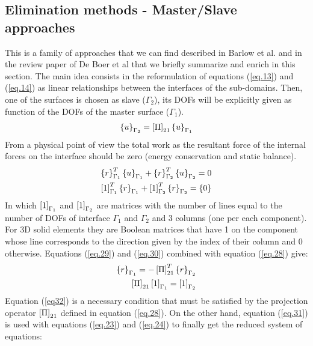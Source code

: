   \subsection{Elimination methods - Master/Slave  approaches}\label{ssec33}
  This is a family of approaches that we can find described in Barlow et al. \cite{barlow1982constraint} and in the review paper of De Boer et al \cite{de2007review} that we briefly summarize and enrich in this section. The main idea consists in the reformulation of equations (\ref{eq.13}) and (\ref{eq.14}) as linear relationships between the interfaces of the sub-domains. Then, one of the surfaces is chosen as slave ($\Gamma_2$), its DOFs will be explicitly given as function of the DOFs of the master surface ($\Gamma_1$).  
  \begin{equation}
  \label{eq.28}
  \left\lbrace{u}\right \rbrace_{\Gamma_2}=\left[{\Pi}\right]_{21}\left\lbrace{u}\right \rbrace_{\Gamma_1}
  \end{equation}
  From a physical point of view the total work as the resultant force  of the internal forces on the interface should be zero (energy conservation and static balance).
  \begin{eqnarray}
  \label{eq.29}
  \left\lbrace{r}\right \rbrace_{\Gamma_1}^T\left\lbrace{u}\right \rbrace_{\Gamma_1}+\left\lbrace{r}\right \rbrace_{\Gamma_2}^T\left\lbrace{u}\right \rbrace_{\Gamma_2}=0\\
  \label{eq.30}
  \left[{1}\right]_{\Gamma_1}^T\left\lbrace{r}\right \rbrace_{\Gamma_1}+\left[{1}\right]_{\Gamma_2}^T\left\lbrace{r}\right \rbrace_{\Gamma_2}=\left\lbrace{0}\right \rbrace
  \end{eqnarray}
  In which $\left[{1}\right]_{\Gamma_1}$ and $\left[{1}\right]_{\Gamma_2}$ are matrices with the number of lines equal to the number of DOFs of interface ${\Gamma_1}$ and ${\Gamma_2}$ and 3 columns (one per each component). For 3D solid elements they are Boolean matrices that have 1 on the component whose line corresponds to the direction given by the index of their column and 0 otherwise. 
   Equations (\ref{eq.29}) and (\ref{eq.30}) combined with equation (\ref{eq.28}) give:
  \begin{eqnarray}
  \label{eq.31}
  \left\lbrace{r}\right \rbrace_{\Gamma_1}=-\left[{\Pi}\right]_{21}^T\left\lbrace{r}\right \rbrace_{\Gamma_2}\\
  \label{eq32}
  \left[{\Pi}\right]_{21}\left[{1}\right]_{\Gamma_1}=\left[{1}\right]_{\Gamma_2}
  \end{eqnarray}
  Equation (\ref{eq32}) is a necessary condition that must be satisfied by the projection operator $\left[{\Pi}\right]_{21}$ defined in equation (\ref{eq.28}). On the other hand, equation (\ref{eq.31}) is used with equations (\ref{eq.23}) and (\ref{eq.24}) to finally get the reduced system of equations:
